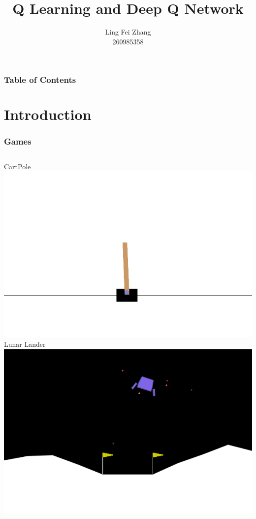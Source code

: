 \documentclass{beamer}
\title{Q Learning and Deep Q Network}
\author{Ling Fei Zhang\\
    260985358}
\begin{document}
\maketitle

\begin{frame}
    \frametitle{Table of Contents}
    \tableofcontents
\end{frame}

\section{Introduction}

\begin{frame}
    \frametitle{Games}
    \begin{columns}
        \centering
        CartPole
        \medskip
        \includegraphics[width=\textwidth]{cart_pole.png}
        \centering
        Lunar Lander
        \medskip
        \includegraphics[width=\textwidth]{lunar.png}
    \end{columns}
\end{frame}
\end{document}
